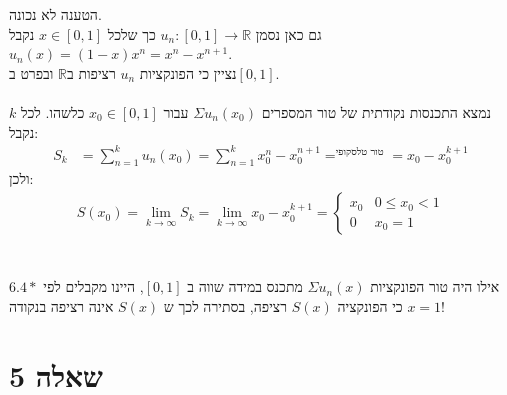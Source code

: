 \documentclass{article}
\DeclareMathOperator*{\equals}{=}
\def\reals{\mathbb{R}}
\begin{document}
הטענה לא נכונה. \\
גם כאן נסמן $u_n: [0,1]\rightarrow \reals$ כך שלכל $x\in[0,1]$ נקבל $u_n(x)=(1-x)x^n=x^n-x^{n+1}$. \\
נציין כי הפונקציות $u_n$ רציפות ב$\reals$ ובפרט ב$[0,1]$. \\\\
נמצא התכנסות נקודתית של טור המספרים $\Sigma u_n(x_0)$ עבור $x_0\in[0,1]$ כלשהו. לכל $k$ נקבל:
\begin{align*}
    S_k & =\sum_{n=1}^k u_n(x_0)=\sum_{n=1}^k x_0^{n}-x_0^{n+1} \equals^{\text{טור טלסקופי}}= x_0 - x_0^{k+1}
\end{align*}
ולכן:
\begin{align*}
    S(x_0)=
    \lim_{k\rightarrow \infty} S_k=
    \lim_{k\rightarrow \infty} x_0 - x_0^{k+1}=
    \begin{cases}
        x_0 & 0\leq x_0 < 1 \\
        0   & x_0 = 1
    \end{cases}
\end{align*}
\\\\
אילו היה טור הפונקציות $\Sigma u_n(x)$ מתכנס במידה שווה ב $[0,1]$, היינו מקבלים לפי $6.4*$ כי הפונקציה $S(x)$ רציפה, בסתירה לכך ש $S(x)$ אינה רציפה בנקודה $x=1$!

\pagebreak

\section*{שאלה 5}
\end{document}
